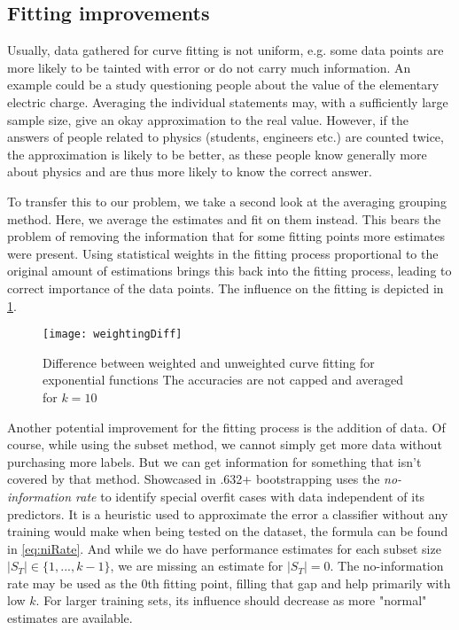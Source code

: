 \subsection{Fitting improvements}
Usually, data gathered for curve fitting is not uniform, e.g. some data points are more likely to be tainted with error or do not carry much information. An example could be a study questioning people about the value of the elementary electric charge. Averaging the individual statements may, with a sufficiently large sample size, give an okay approximation to the real value. However, if the answers of people related to physics (students, engineers etc.) are counted twice, the approximation is likely to be better, as these people know generally more about physics and are thus more likely to know the correct answer.

To transfer this to our problem, we take a second look at the averaging grouping method. Here, we average the estimates and fit on them instead. This bears the problem of removing the information that for some fitting points more estimates were present. Using statistical weights in the fitting process proportional to the original amount of estimations brings this back into the fitting process, leading to correct importance of the data points. The influence on the fitting is depicted in \ref{fig:weigthingExample}.

\begin{figure}[h]
	\centering
	\texttt{[image: weightingDiff]}
	\caption{Difference between weighted and unweighted curve fitting for exponential functions The accuracies are not capped and averaged for $k = 10$}
	\label{fig:weigthingExample}
\end{figure}

Another potential improvement for the fitting process is the addition of data. Of course, while using the subset method, we cannot simply get more data without purchasing more labels. But we can get information for something that isn't covered by that method. Showcased in \cite{EfronEtAl1997} .632+ bootstrapping uses the \textit{no-information rate} to identify special overfit cases with data independent of its predictors. It is a heuristic used to approximate the error a classifier without any training would make when being tested on the dataset, the formula can be found in \eqref{eq:niRate}. And while we do have performance estimates for each subset size $|S_T| \in \{1, ..., k-1\}$, we are missing an estimate for $|S_T| = 0$. The no-information rate may be used as the 0th fitting point, filling that gap and help primarily with low $k$. For larger training sets, its influence should decrease as more "normal" estimates are available.

